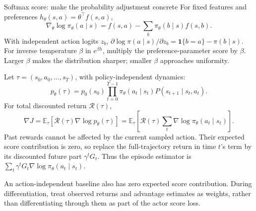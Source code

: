 \documentclass[10pt,a4paper]{article}
\newcommand{\E}{\mathbb E}
\newcommand{\ind}{\mathbf 1}
\begin{document}
\begin{card}{Softmax score: make the probability adjustment concrete}
For fixed features and preferences $h_\theta(s,a)=\theta^\top f(s,a)$,
\[
\nabla_\theta\log\pi_\theta(a\mid s)
=f(s,a)-\sum_b\pi_\theta(b\mid s)f(s,b).
\]
With independent action logits $z_b$, $\partial\log\pi(a\mid s)/\partial z_b=\ind\{b=a\}-\pi(b\mid s)$. For inverse temperature $\beta$ in $e^{\beta h}$, multiply the preference-parameter score by $\beta$. Larger $\beta$ makes the distribution sharper; smaller $\beta$ approaches uniformity.
\end{card}

\begin{prf}
Let $\tau=(s_0,a_0,\ldots,s_T)$, with policy-independent dynamics:
\[
p_\theta(\tau)=p_0(s_0)\prod_{t=0}^{T-1}\pi_\theta(a_t\mid s_t)P(s_{t+1}\mid s_t,a_t).
\]
For total discounted return $\mathcal R(\tau)$,
\[
\nabla J=\E_\tau[\mathcal R(\tau)\nabla\log p_\theta(\tau)]
=\E_\tau\left[\mathcal R(\tau)\sum_t\nabla\log\pi_\theta(a_t\mid s_t)\right].
\]
Past rewards cannot be affected by the current sampled action. Their expected score contribution is zero, so replace the full-trajectory return in time $t$'s term by its discounted future part $\gamma^tG_t$. Thus the episode estimator is $\sum_t\gamma^tG_t\nabla\log\pi_\theta(a_t\mid s_t)$.

An action-independent baseline also has zero expected score contribution. During differentiation, treat observed returns and advantage estimates as weights, rather than differentiating through them as part of the actor score loss.
\end{prf}
\end{document}
